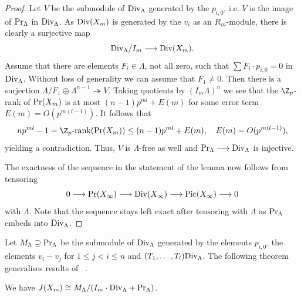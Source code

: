 \begin{proof}
	Let $V$ be the submodule of $\textup{Div}_\Lambda$ generated by the $p_{i,0}$, i.e. $V$ is the image of $\textup{Pr}_\Lambda$ in $\textup{Div}_\Lambda$. As $\textup{Div}(X_m)$ is generated by the $v_i$ as an $R_m$-module, there is clearly a surjective map 
	\[\textup{Div}_\Lambda/I_m\longrightarrow \textup{Div}(X_m).\]
	Assume that there are elements $F_i\in \Lambda$, not all zero, such that ${\sum F_i \cdot p_{i,0}=0}$ in $\textup{Div}_\Lambda$. Without loss of generality we can assume that $F_1\neq 0$. Then there is a surjection ${\Lambda/F_1\oplus \Lambda ^{n-1}\twoheadrightarrow V}$. Taking quotients by $(I_m\Lambda)^n$ we see that the $\Z_p$-rank of $\textup{Pr}(X_m)$ is at most ${(n-1)p^{ml}+E(m)}$ for some error term ${E(m) = O(p^{m(l-1)})}$. It follows that \[np^{ml}-1=\Z_p\textup{-rank}(\textup{Pr}(X_m)) \le (n-1)p^{ml}+ E(m), \quad E(m) = O(p^{m(l-1)}),\] yielding a contradiction. Thus, $V$ is $\Lambda$-free as well and ${\textup{Pr}_\Lambda\longrightarrow \textup{Div}_\Lambda}$ is injective.
	
	The exactness of the sequence in the statement of the lemma now follows from tensoring 
	\[0\longrightarrow \textup{Pr}(X_\infty)\longrightarrow\textup{Div}(X_\infty)\longrightarrow \textup{Pic}(X_\infty)\longrightarrow 0\] 
	with $\Lambda$. Note that the sequence stays left exact after tensoring with $\Lambda$ as $\textup{Pr}_\Lambda$ embeds into $\textup{Div}_\Lambda$.\end{proof}
Let $M_\Lambda \supseteq \textup{Pr}_\Lambda$ be the submodule of $\textup{Div}_\Lambda$ generated by the elements $p_{i,0}$, the elements ${v_i-v_{j}}$ for ${1 \le j < i \le n}$ and $(T_1,\ldots, T_l)\textup{Div}_\Lambda$. The following theorem generalises results of ~\cite[Section~5]{diss-gonet}. 
\begin{thm} \label{thm:jacobian} 
	We have $J(X_m)\cong M_\Lambda/(I_m \cdot \textup{Div}_\Lambda+\textup{Pr}_\Lambda)$.
\end{thm}
